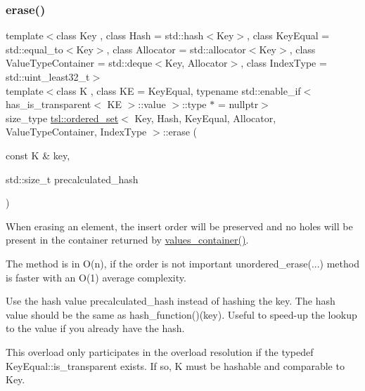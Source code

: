 \subsubsection{\texorpdfstring{erase()}{erase()}\hspace{0.1cm}{\footnotesize\ttfamily [7/7]}}
{\footnotesize\ttfamily template$<$class Key , class Hash  = std\+::hash$<$\+Key$>$, class Key\+Equal  = std\+::equal\+\_\+to$<$\+Key$>$, class Allocator  = std\+::allocator$<$\+Key$>$, class Value\+Type\+Container  = std\+::deque$<$\+Key, Allocator$>$, class Index\+Type  = std\+::uint\+\_\+least32\+\_\+t$>$ \\
template$<$class K , class KE  = Key\+Equal, typename std\+::enable\+\_\+if$<$ has\+\_\+is\+\_\+transparent$<$ K\+E $>$\+::value $>$\+::type $\ast$  = nullptr$>$ \\
size\+\_\+type \mbox{\hyperlink{classtsl_1_1ordered__set}{tsl\+::ordered\+\_\+set}}$<$ Key, Hash, Key\+Equal, Allocator, Value\+Type\+Container, Index\+Type $>$\+::erase (\begin{DoxyParamCaption}\item[{const K \&}]{key,  }\item[{std\+::size\+\_\+t}]{precalculated\+\_\+hash }\end{DoxyParamCaption})\hspace{0.3cm}{\ttfamily [inline]}}





When erasing an element, the insert order will be preserved and no holes will be present in the container returned by \textquotesingle{}\mbox{\hyperlink{classtsl_1_1ordered__set_a1bc951514a5c4c29c14b6cf5177cf1ec}{values\+\_\+container()}}\textquotesingle{}.

The method is in O(n), if the order is not important \textquotesingle{}unordered\+\_\+erase(...)\textquotesingle{} method is faster with an O(1) average complexity.

Use the hash value \textquotesingle{}precalculated\+\_\+hash\textquotesingle{} instead of hashing the key. The hash value should be the same as hash\+\_\+function()(key). Useful to speed-\/up the lookup to the value if you already have the hash.

This overload only participates in the overload resolution if the typedef Key\+Equal\+::is\+\_\+transparent exists. If so, K must be hashable and comparable to Key. \mbox{\label{classtsl_1_1ordered__set_abe63aacec0b31672f70753f20c7e0d8b}} 
